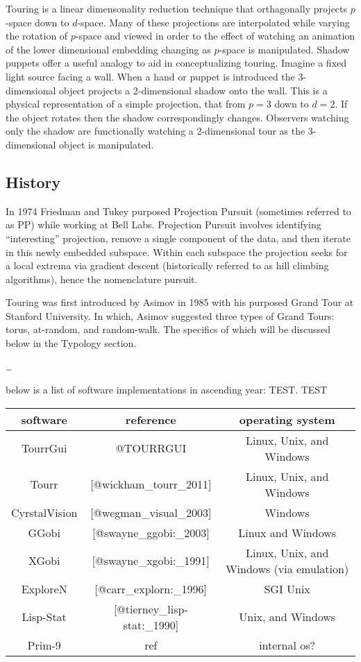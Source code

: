 \documentclass{monashthesis}
\begin{document}
Touring is a linear dimensonality reduction technique that orthagonally
projects \(p\)-space down to \(d\)-space. Many of these projections are
interpolated while varying the rotation of \(p\)-space and viewed in
order to the effect of watching an animation of the lower dimensional
embedding changing as \(p\)-space is manipulated. Shadow puppets offer a
useful analogy to aid in conceptualizing touring. Imagine a fixed light
source facing a wall. When a hand or puppet is introduced the
3-dimensional object projects a 2-dimensional shadow onto the wall. This
is a physical representation of a simple projection, that from \(p=3\)
down to \(d=2\). If the object rotates then the shadow correspondingly
changes. Observers watching only the shadow are functionally watching a
2-dimensional tour as the 3-dimensional object is manipulated.

\subsection{History}\label{history}

In 1974 Friedman and Tukey purposed Projection
Pursuit\autocite{friedman_projection_1974} (sometimes referred to as PP)
while working at Bell Labs. Projection Pursuit involves identifying
``interesting'' projection, remove a single component of the data, and
then iterate in this newly embedded subspace. Within each subspace the
projection seeks for a local extrema via gradient descent (historically
referred to as hill climbing algorithms), hence the nomenclature
pursuit.

Touring was first introduced by Asimov in 1985 with his purposed Grand
Tour\autocite{asimov_grand_1985} at Stanford University. In which,
Asimov suggested three types of Grand Tours: torus, at-random, and
random-walk. The specifics of which will be discussed below in the
Typology section.

\ldots{}

below is a list of software implementations in ascending year:
TEST\autocite{wickham_tourr_2011}. TEST
\autocite{wickham_tourr_2011}\autocite{wickham_tourr_2011}

\begin{table}[h!]
\centering
 \begin{tabular}{|c c c|} 
 software & reference & operating system \\
 \hline\hline
 TourrGui & @TOURRGUI & Linux, Unix, and Windows \\
 Tourr & [@wickham\_tourr\_2011] & Linux, Unix, and Windows \\
 CyrstalVision & [@wegman\_visual\_2003] & Windows \\
 GGobi & [@swayne\_ggobi:\_2003] & Linux and Windows \\
 XGobi & [@swayne\_xgobi:\_1991] & Linux, Unix, and Windows (via emulation) \\
 ExploreN & [@carr\_explorn:\_1996] & SGI Unix \\
 Lisp-Stat & [@tierney\_lisp-stat:\_1990] & Unix, and Windows \\
 Prim-9 & ref & internal os? \\
 \hline
 \end{tabular}
\end{table}
\end{document}
